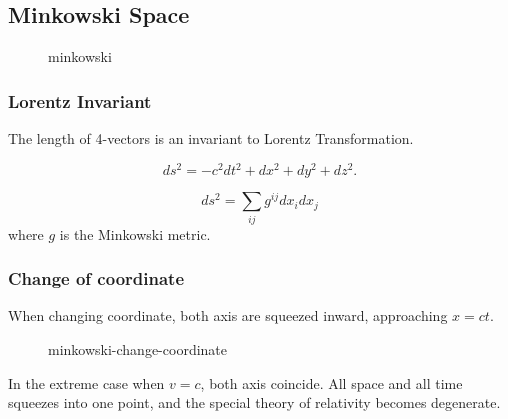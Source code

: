 
\subsection{Minkowski Space}
\begin{figure}[H]
    \centering
    \caption{minkowski}
    \label{fig:minkowski}
\end{figure}

\subsubsection{Lorentz Invariant}

The length of 4-vectors is an invariant to Lorentz Transformation.

\[
	ds^2 = -c^2 dt^2 + dx^2 + dy^2 + dz^2
.\] 

\[
	ds^2 = \sum_{ij} g^{ij} dx_i dx_j
\] 
where $g$ is the Minkowski metric.

\subsubsection{Change of coordinate}

When changing coordinate, both axis are squeezed inward, approaching $x = c t$. 

\begin{figure}[ht]
    \centering
    \caption{minkowski-change-coordinate}
    \label{fig:minkowski-change-coordinate}
\end{figure}

\begin{remark}
	In the extreme case when $v = c$, both axis coincide. All space and all time squeezes into one point, and the special theory of relativity becomes degenerate.
\end{remark}

